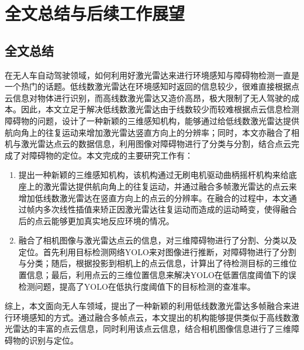
\chapter{全文总结与后续工作展望}

\section{全文总结}
在无人车自动驾驶领域，如何利用好激光雷达来进行环境感知与障碍物检测一直是一个热门的话题。低线数激光雷达在环境感知时返回的信息较少，很难直接根据点云信息对物体进行识别，而高线数激光雷达又造价高昂，极大限制了无人驾驶的成本。因此，本文立足于解决低线数激光雷达由于线数较少而较难根据点云信息检测障碍物的问题，设计了一种新颖的三维感知机构，能够通过给低线数激光雷达提供航向角上的往复运动来增加激光雷达竖直方向上的分辨率；同时，本文亦融合了相机与激光雷达点云的数据信息，利用图像对障碍物进行了分类与分割，结合点云完成了对障碍物的定位。本文完成的主要研究工作有：
\begin{enumerate}
    \item 提出一种新颖的三维感知机构，该机构通过无刷电机驱动曲柄摇杆机构来给底座上的激光雷达提供航向角上的往复运动，并通过融合多帧激光雷达的点云来增加低线数激光雷达在竖直方向上的点云的分辨率。在融合的过程中，本文通过帧内多次线性插值来矫正因激光雷达往复运动而造成的运动畸变，使得融合后的点云能够更加真实地反应环境的情况。
    \item 融合了相机图像与激光雷达点云的信息，对三维障碍物进行了分割、分类以及定位。首先利用目标检测网络YOLO来对图像进行推断，对障碍物进行了分割与分类；随后，根据投影到相机上的点云信息，计算出了待检测目标的三维位置信息；最后，利用点云的三维位置信息来解决YOLO在低置信度阈值下的误检测问题，提高了YOLO在低执行度阈值下的目标检测的查准率。
\end{enumerate}

综上，本文面向无人车领域，提出了一种新颖的利用低线数激光雷达多帧融合来进行环境感知的方式。通过融合多帧点云，本文提出的机构能够提供类似于高线数激光雷达的丰富的点云信息，同时利用该点云信息，结合相机图像信息进行了三维障碍物的识别与定位。

